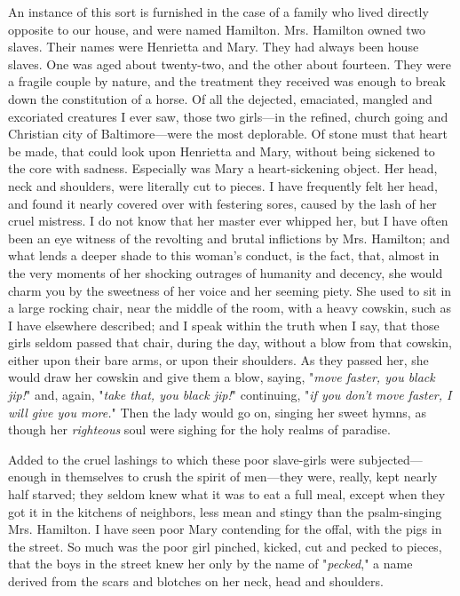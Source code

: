 An instance of this sort is furnished in the case of a family who lived
directly opposite to our house, and were named Hamilton. Mrs. Hamilton
owned two slaves. Their names were Henrietta and Mary. They had always
been house slaves. One was aged about twenty-two, and the other about
fourteen. They were a fragile couple by nature, and the treatment they
received was enough to break down the constitution of a horse. Of all
the dejected, emaciated, mangled and excoriated creatures I ever saw,
those two girls---in the refined, church going and Christian city of
Baltimore---were the most deplorable. Of stone must that heart be made,
that could look upon Henrietta and Mary, without being
{\protect\hypertarget{149}{}{}}sickened to the core with sadness.
Especially was Mary a heart-sickening object. Her head, neck and
shoulders, were literally cut to pieces. I have frequently felt her
head, and found it nearly covered over with festering sores, caused by
the lash of her cruel mistress. I do not know that her master ever
whipped her, but I have often been an eye witness of the revolting and
brutal inflictions by Mrs. Hamilton; and what lends a deeper shade to
this woman's conduct, is the fact, that, almost in the very moments of
her shocking outrages of humanity and decency, she would charm you by
the sweetness of her voice and her seeming piety. She used to sit in a
large rocking chair, near the middle of the room, with a heavy cowskin,
such as I have elsewhere described; and I speak within the truth when I
say, that those girls seldom passed that chair, during the day, without
a blow from that cowskin, either upon their bare arms, or upon their
shoulders. As they passed her, she would draw her cowskin and give them
a blow, saying, "\emph{move faster, you black jip!}" and, again,
"\emph{take that, you black jip!}" continuing, "\emph{if you don't move
faster, I will give you more.}" Then the lady would go on, singing her
sweet hymns, as though her \emph{righteous} soul were sighing for the
holy realms of paradise.

Added to the cruel lashings to which these poor slave-girls were
subjected---enough in themselves to crush the spirit of men---they were,
really, kept nearly half starved; they seldom knew what it was to eat a
full meal, except when they got it in the kitchens of neighbors, less
mean and stingy than the {\protect\hypertarget{150}{}{}}psalm-singing
Mrs. Hamilton. I have seen poor Mary contending for the offal, with the
pigs in the street. So much was the poor girl pinched, kicked, cut and
pecked to pieces, that the boys in the street knew her only by the name
of "\emph{pecked}," a name derived from the scars and blotches on her
neck, head and shoulders.


